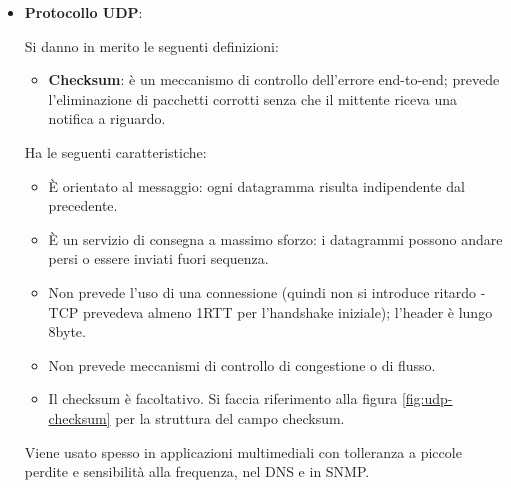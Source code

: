 \documentclass[11pt, italian, openany]{book}
\begin{document}
\begin{sloppypar}
\begin{itemize}[topsep=0pt, itemsep=0pt, parsep=0pt]
\begin{itemize}[topsep=0pt, itemsep=0pt, parsep=0pt]
		Si implementa inoltre lo stato di ``half-close'': uno dei due processi smette di inviare dati mentre ne sta ancora ricevendo; si veda in proposito
		la figura \ref{fig:tcp-half-close}.
		
		Per alcuni esempi, si vedano le figure \ref{fig:chiusura-3way}, \ref{fig:tcp-apertura-chiusura} e \ref{fig:tcp-chiusura}.
	\end{itemize}

	Durante una connessione TCP vengono attraversati pi\`u stati dai dispositivi terminali, tra questi si menziona lo stato \textbf{TIME}:
	indica che il dispositivo si trova adesso in attesa per un periodo di tempo lungo due volte la ``Maximum Segment Lifetime" in modo tale da assicurarsi che
	l'altro endpoint abbia riconosciuto la richiesta di chiusura della connessione; questo stato viene utilizzato per consentire l'eliminazione di segmenti
	duplicati in rete e implementare in maniera affidabile la terminazione della connessione in entrambe le direzioni.

	\item \textbf{Protocollo UDP}:
	Si danno in merito le seguenti definizioni:
	\begin{itemize}[topsep=0pt, itemsep=0pt]
		\item \textbf{Checksum}: \`e un meccanismo di controllo dell'errore end-to-end; prevede l'eliminazione di pacchetti corrotti senza che il mittente
		riceva una notifica a riguardo.
	\end{itemize}
	Ha le seguenti caratteristiche:
	\begin{itemize}[topsep=0pt, itemsep=0pt]
		\item \`E orientato al messaggio: ogni datagramma risulta indipendente dal precedente.
		\item \`E un servizio di consegna a massimo sforzo: i datagrammi possono andare persi o essere inviati fuori sequenza.
		\item Non prevede l'uso di una connessione (quindi non si introduce ritardo - TCP prevedeva almeno 1RTT per l'handshake iniziale); l'header \`e lungo
		8byte.
		\item Non prevede meccanismi di controllo di congestione o di flusso.
		\item Il checksum \`e facoltativo. Si faccia riferimento alla figura \ref{fig:udp-checksum} per la struttura del campo checksum.
	\end{itemize}
	Viene usato spesso in applicazioni multimediali con tolleranza a piccole perdite e sensibilit\`a alla frequenza, nel DNS e in SNMP.


\end{itemize}
\end{sloppypar}
\end{document}
